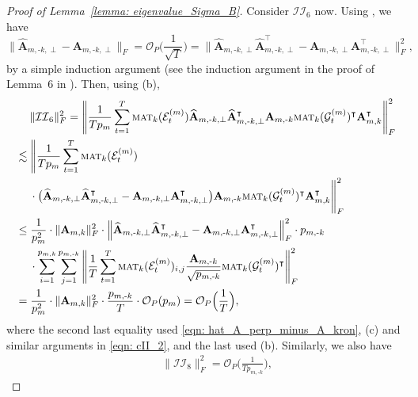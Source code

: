 \documentclass[aos]{imsart}
\theoremstyle{plain}
\theoremstyle{definition}
\def\mat{\textnormal{\textsc{mat}}}
\def\wh#1{\widehat{#1}}
\def\cE{\mathcal{E}}
\def\cG{\mathcal{G}} \def\cH{\boldsymbol{\mathcal{H}}} \def\cI{\mathcal{I}}
\def\cII{\mathcal{II}}
\def\cO{\mathcal{O}}
\def\bA{\mathbf{A}}
\def\trans{\intercal}
\begin{document}
\begin{proof}[Proof of Lemma~\ref{lemma: eigenvalue_Sigma_B}]
Consider $\cII_6$ now. Using , we have
\begin{equation}
\label{eqn: hat_A_perp_minus_A_kron}
    \Big\| \wh{\bA}_{m,\text{-}k,\perp} -\bA_{m,\text{-}k,\perp} \Big\|_F = \cO_P\Big( \frac{1}{\sqrt{T}} \Big)
    = \Big\| \wh{\bA}_{m,\text{-}k,\perp} \wh{\bA}_{m,\text{-}k,\perp}^\trans - \bA_{m,\text{-}k,\perp} \bA_{m,\text{-}k,\perp}^\trans \Big\|_F^2 ,
\end{equation}
by a simple induction argument (see  the induction argument in the proof of Lemma~6 in \cite{CenLam2025_KronProd}). Then, using (b),
\begin{align}
    &\;\quad
    \|\cII_6\|_F^2 = \Bigg\| \frac{1}{Tp_m} \sum_{t=1}^T \mat_k(\cE_t^{(m)}) \wh{\bA}_{m,\text{-}k,\perp} \wh{\bA}_{m,\text{-}k,\perp}^\trans \bA_{m,\text{-}k} \mat_k(\cG_t^{(m)})^\trans \bA_{m,k}^\trans \Bigg\|_F^2 \notag \\
    &\lesssim
    \Bigg\| \frac{1}{Tp_m} \sum_{t=1}^T \mat_k(\cE_t^{(m)}) \notag \\
    &\;\quad
    \cdot \big( \wh{\bA}_{m,\text{-}k,\perp} \wh{\bA}_{m,\text{-}k,\perp}^\trans - \bA_{m,\text{-}k,\perp} \bA_{m,\text{-}k,\perp}^\trans \big) \bA_{m,\text{-}k} \mat_k(\cG_t^{(m)})^\trans \bA_{m,k}^\trans \Bigg\|_F^2 \notag \\
    &\leq
    \frac{1}{p_m^2} \cdot \|\bA_{m,k}\|_F^2 \cdot \Big\| \wh{\bA}_{m,\text{-}k,\perp} \wh{\bA}_{m,\text{-}k,\perp}^\trans - \bA_{m,\text{-}k,\perp} \bA_{m,\text{-}k,\perp}^\trans \Big\|_F^2 \cdot p_{m,\text{-}k} \notag \\
    &\;\quad
    \cdot \sum_{i=1}^{p_{m,k}} \sum_{j=1}^{p_{m,\text{-}k}} \Bigg\| \frac{1}{T} \sum_{t=1}^T \mat_k(\cE_t^{(m)})_{i,j} \frac{\bA_{m,\text{-}k}}{\sqrt{p_{m,\text{-}k}}} \mat_k(\cG_t^{(m)})^\trans \Bigg\|_F^2 \notag \\
    &=
    \frac{1}{p_m^2} \cdot \|\bA_{m,k}\|_F^2 \cdot \frac{p_{m,\text{-}k}}{T} \cdot \cO_P(p_{m})
    = \cO_P\Big( \frac{1}{T} \Big) ,
    \label{eqn: cII_6}
\end{align}
where the second last equality used \eqref{eqn: hat_A_perp_minus_A_kron}, (c) and similar arguments in \eqref{eqn: cII_2}, and the last used (b). Similarly, we also have
\begin{align}
    &\;\quad
    \|\cII_8\|_F^2 = \cO_P\Big( \frac{1}{T p_{m,\text{-}k}} \Big) ,
    \label{eqn: cII_8}
\end{align}



\end{proof}
\end{document}
